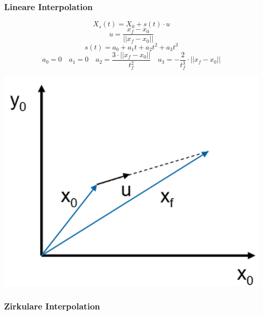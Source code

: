 \begin{minipage}{0.7\linewidth}
    \subsubsection{Lineare Interpolation }
    \vspace{-0.8cm}
    \[ X_s(t) = X_0 + s(t) \cdot u \]
    \[ u= \frac{x_f - x_0}{||x_f -x_0||} \]
    \[ s(t)=a_0 + a_1 t + a_2 t^2 +a_3t^3 \]
    \[ a_0=0 \quad a_1=0 \quad a_2=\frac{3\cdot ||x_f-x_0||}{t_f^2} \quad a_3=-\frac{2}{t_f^3}\cdot ||x_f-x_0||  \]
\end{minipage}
\begin{minipage}{0.3\linewidth}
    \includegraphics[width=0.9\linewidth]{./bilder/LinInter}
\end{minipage}

\subsubsection{Zirkulare Interpolation }
\clearpage

